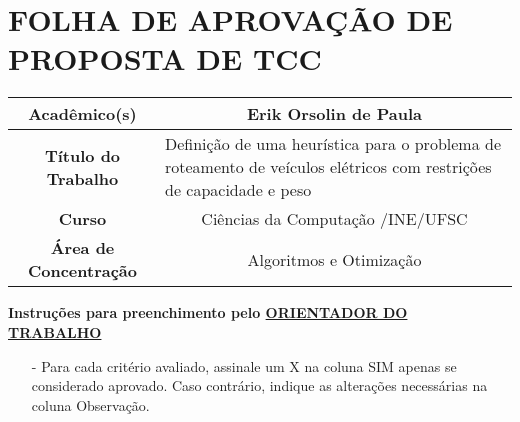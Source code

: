 \documentclass{ufscThesis}
\begin{document}
\capa
\paginadedicatoria
\paginaresumo
\paginaabstract

\chapter*{FOLHA DE APROVAÇÃO DE PROPOSTA DE TCC}
\begin{table}[H]
	\begin{tabular}{|c|p{12cm}|}
		\hline
		\textbf{Acadêmico(s)} & \multicolumn{1}{c|}{Erik Orsolin de Paula}\\\hline
		\textbf{Título do Trabalho} & Definição de uma heurística para o problema de roteamento de veículos elétricos com restrições de capacidade e peso\\\hline
		\textbf{Curso} & \multicolumn{1}{c|}{Ciências da Computação /INE/UFSC}\\\hline
		\textbf{Área de Concentração} & \multicolumn{1}{c|}{Algoritmos e Otimização}\\\hline
	\end{tabular}
\end{table}

\noindent \textbf{Instruções para preenchimento pelo \underline{ORIENTADOR DO}\\\underline{TRABALHO}}
	\begin{itemize}
		\item[-]Para cada critério avaliado, assinale um X na coluna SIM apenas se considerado aprovado. Caso contrário, indique as alterações necessárias na coluna Observação.
	\end{itemize}
\end{document}
